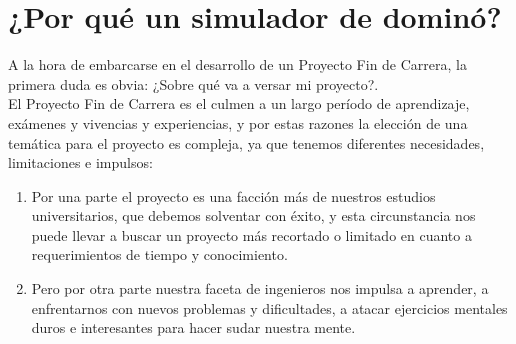 

\section{¿Por qué un simulador de dominó?}

A la hora de embarcarse en el desarrollo de un Proyecto Fin de Carrera, la primera duda es obvia:
¿Sobre qué va a versar mi proyecto?.\\

El Proyecto Fin de Carrera es el culmen a un largo período de aprendizaje, exámenes y vivencias y
experiencias, y por estas razones la elección de una temática para el proyecto es compleja, ya que
tenemos diferentes necesidades, limitaciones e impulsos:
\begin{enumerate}
    \item Por una parte el proyecto es una facción más de nuestros estudios universitarios, que
            debemos solventar con éxito, y esta circunstancia nos puede llevar a buscar un proyecto
            más recortado o limitado en cuanto a requerimientos de tiempo y conocimiento.
    \item Pero por otra parte nuestra faceta de ingenieros nos impulsa a aprender, a enfrentarnos
            con nuevos problemas y dificultades, a atacar ejercicios mentales duros e interesantes
            para hacer sudar nuestra mente.
\end{enumerate}

